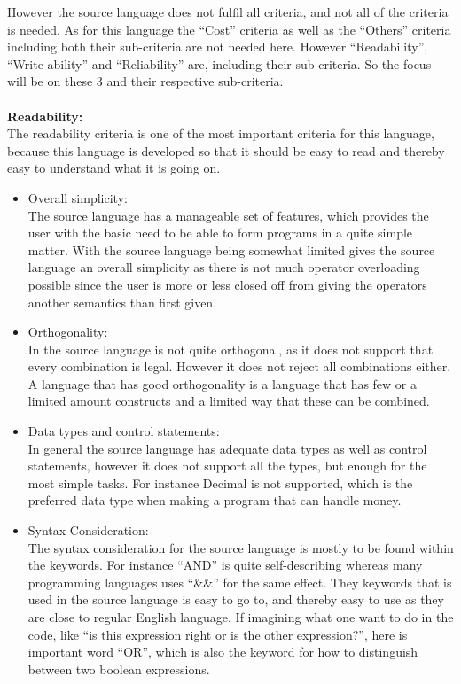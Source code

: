 However the source language does not fulfil all criteria, and not all of the criteria is needed. As for this language the ``Cost'' criteria as well as the ``Others'' criteria including both their sub-criteria are not needed here. However ``Readability'', ``Write-ability'' and ``Reliability'' are, including their sub-criteria. So the focus will be on these 3 and their respective sub-criteria. \\ \\
\textbf{Readability:} \\
The readability criteria is one of the most important criteria for this language, because this language is developed so that it should be easy to read and thereby easy to understand what it is going on. \\
\begin{itemize}
\item Overall simplicity:\\
The source language has a manageable set of features, which provides the user with the basic need to be able to form programs in a quite simple matter. With the source language being somewhat limited gives the source language an overall simplicity as there is not much operator overloading possible since the user is more or less closed off from giving the operators another semantics than first given. 
\item Orthogonality:\\
In the source language is not quite orthogonal, as it does not support that every combination is legal. However it does not reject all combinations either. A language that has good orthogonality is a language that has few or a limited amount constructs and a limited way that these can be combined. 
\item Data types and control statements:\\
In general the source language has adequate data types as well as control statements, however it does not support all the types, but enough for the most simple tasks. For instance Decimal is not supported, which is the preferred data type when making a program that can handle money. 
\item Syntax Consideration:\\
The syntax consideration for the source language is mostly to be found within the keywords. For instance ``AND'' is quite self-describing whereas many programming languages uses ``\&\&'' for the same effect. They keywords that is used in the source language is easy to go to, and thereby easy to use as they are close to regular English language. If imagining what one want to do in the code, like ``is this expression right or is the other expression?'', here is important word ``OR'', which is also the keyword for how to distinguish between two boolean expressions.\\ 
\end{itemize}


